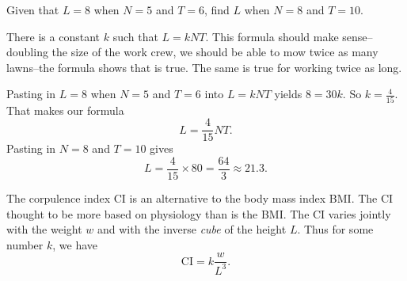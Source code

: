 \documentclass[12pt,fleqn,answers]{exam}
\begin{document}
\begin{questions}
Given that $L = 8$ when $N = 5$ and $T = 6$, find $L$ when
$N = 8$ and $T = 10$.
\begin{solution}[3.5in]
There is a constant $k$ such that $L =k N T$. This formula should make sense--doubling the size of the work crew, we
should be able to mow twice as many lawns--the formula shows that is true. The same is true for working twice as long.

Pasting in $L = 8$ when $N = 5$ and $T = 6$ into $L =k N T$ yields $8 = 30 k$.  So $k = \frac{4}{15}$.  That makes
our formula
\begin{equation*}
L = \frac{4}{15} N T.
\end{equation*}
Pasting in $N = 8$ and $T = 10$ gives
\begin{equation*}
L = \frac{4}{15} \times 80 = \frac{64}{3} \approx 21.3.
\end{equation*}




\end{solution}


\question The corpulence index CI is an alternative to the 
body mass index BMI. The CI thought to be more based on physiology than 
is the BMI. The CI varies jointly with the weight $w$ and with the inverse 
\emph{cube} of the height $L$. Thus for some number $k$, we have
\begin{equation*}
    \mathrm{CI} = k  \frac{w}{L^3}.
\end{equation*}

\end{questions}
\end{document}
